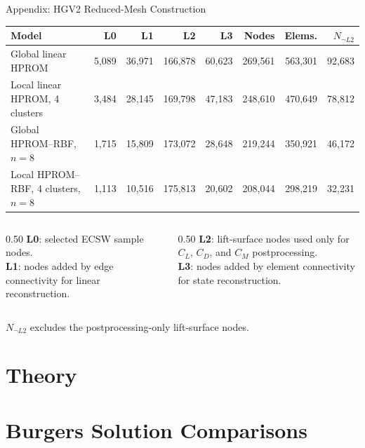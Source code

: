 \documentclass[aspectratio=169]{beamer}
\begin{document}
\begin{frame}{Appendix: HGV2 Reduced-Mesh Construction}
\centering
\scriptsize
\renewcommand{\arraystretch}{1.17}
\setlength{\tabcolsep}{2pt}
\begin{tabular}{lrrrrrrr}
\toprule
Model & L0 & L1 & L2 & L3 & Nodes & Elems. & $N_{\neg L2}$ \\
\midrule
Global linear HPROM & 5,089 & 36,971 & 166,878 & 60,623 & 269,561 & 563,301 & 92,683 \\
Local linear HPROM, 4 clusters & 3,484 & 28,145 & 169,798 & 47,183 & 248,610 & 470,649 & 78,812 \\
Global HPROM--RBF, $n=8$ & 1,715 & 15,809 & 173,072 & 28,648 & 219,244 & 350,921 & 46,172 \\
Local HPROM--RBF, 4 clusters, $n=8$ & 1,113 & 10,516 & 175,813 & 20,602 & 208,044 & 298,219 & 32,231 \\
\bottomrule
\end{tabular}

\vspace{0.32cm}
\begin{columns}[T,onlytextwidth]
\begin{column}{0.50\textwidth}
\textbf{L0}: selected ECSW sample nodes.\\
\textbf{L1}: nodes added by edge connectivity for linear reconstruction.
\end{column}
\begin{column}{0.50\textwidth}
\textbf{L2}: lift-surface nodes used only for $C_L$, $C_D$, and $C_M$ postprocessing.\\
\textbf{L3}: nodes added by element connectivity for state reconstruction.
\end{column}
\end{columns}

\vspace{0.18cm}
\footnotesize $N_{\neg L2}$ excludes the postprocessing-only lift-surface nodes.
\end{frame}

\section{Theory}
\BurgersTheoryFrames

\section{Burgers Solution Comparisons}
\BurgersSolutionFigureFrames
\end{document}
